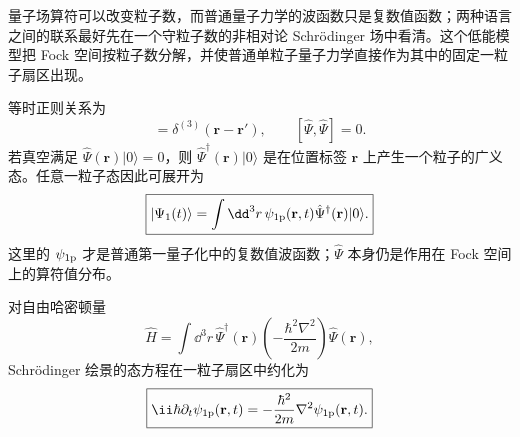 
量子场算符可以改变粒子数，而普通量子力学的波函数只是复数值函数；两种语言之间的联系最好先在一个守粒子数的非相对论 Schr\"odinger 场中看清。这个低能模型把 Fock 空间按粒子数分解，并使普通单粒子量子力学直接作为其中的固定一粒子扇区出现。

等时正则关系为
\begin{equation}
 [\hat\Psi(\mathbf r),\hat\Psi^\dagger(\mathbf r')]
 =\delta^{(3)}(\mathbf r-\mathbf r'),
 \qquad
 [\hat\Psi,\hat\Psi]=0.
 \label{eq:sch-field-comm-r6}
\end{equation}
若真空满足 $\hat\Psi(\mathbf r)|0\rangle=0$，则 $\hat\Psi^\dagger(\mathbf r)|0\rangle$ 是在位置标签 $\mathbf r$ 上产生一个粒子的广义态。任意一粒子态因此可展开为
\begin{equation}
 \boxed{
 |\Psi_1(t)\rangle
 =\int\dd^3 r\,
 \psi_{\rm 1p}(\mathbf r,t)
 \hat\Psi^\dagger(\mathbf r)|0\rangle .}
 \label{eq:fock-oneparticle-expansion-dp68}
\end{equation}
这里的 $\psi_{\rm 1p}$ 才是普通第一量子化中的复数值波函数；$\hat\Psi$ 本身仍是作用在 Fock 空间上的算符值分布。

对自由哈密顿量
\begin{equation*}
 \hat H
 =\int\dd^3 r\,
 \hat\Psi^\dagger(\mathbf r)
 \left(-\frac{\hbar^2\nabla^2}{2m}\right)
 \hat\Psi(\mathbf r),
\end{equation*}
Schr\"odinger 绘景的态方程在一粒子扇区中约化为
\begin{equation}
 \boxed{
 \ii\hbar\partial_t\psi_{\rm 1p}(\mathbf r,t)
 =-\frac{\hbar^2}{2m}\nabla^2\psi_{\rm 1p}(\mathbf r,t).}
 \label{eq:fock-oneparticle-schrodinger-dp68}
\end{equation}

